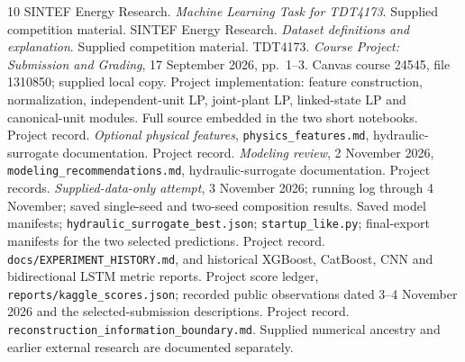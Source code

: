 \documentclass[a4paper,11pt]{article}
\begin{document}
\begin{thebibliography}{10}
 SINTEF Energy Research. \emph{Machine Learning Task for TDT4173}. Supplied competition material.
 SINTEF Energy Research. \emph{Dataset definitions and explanation}. Supplied competition material.
 TDT4173. \emph{Course Project: Submission and Grading}, 17 September 2026, pp.~1--3. Canvas course 24545, file 1310850; supplied local copy.
 Project implementation: feature construction, normalization, independent-unit LP, joint-plant LP, linked-state LP and canonical-unit modules. Full source embedded in the two short notebooks.
 Project record. \emph{Optional physical features}, \texttt{physics\_features.md}, hydraulic-surrogate documentation.
 Project record. \emph{Modeling review}, 2 November 2026, \texttt{modeling\_recommendations.md}, hydraulic-surrogate documentation.
 Project records. \emph{Supplied-data-only attempt}, 3 November 2026; running log through 4 November; saved single-seed and two-seed composition results.
 Saved model manifests; \texttt{hydraulic\_surrogate\_best.json}; \texttt{startup\_like.py}; final-export manifests for the two selected predictions.
 Project record. \texttt{docs/EXPERIMENT\_HISTORY.md}, and historical XGBoost, CatBoost, CNN and bidirectional LSTM metric reports.
 Project score ledger, \texttt{reports/kaggle\_scores.json}; recorded public observations dated 3--4 November 2026 and the selected-submission descriptions.
 Project record. \texttt{reconstruction\_information\_boundary.md}. Supplied numerical ancestry and earlier external research are documented separately.
\end{thebibliography}
\end{document}

